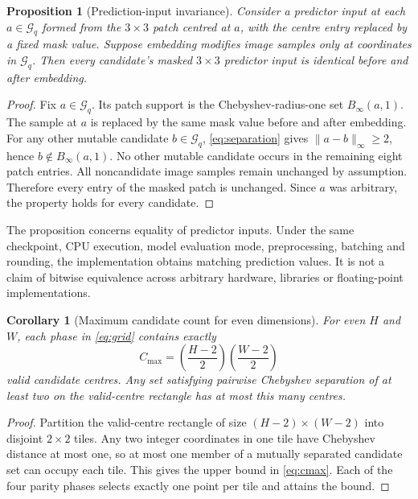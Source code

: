 \documentclass[preprint,12pt,a4paper]{elsarticle}
\newtheorem{proposition}{Proposition}
\newtheorem{corollary}{Corollary}
\begin{document}
\begin{proposition}[Prediction-input invariance]
\label{prop:invariance}
Consider a predictor input at each $a\in\mathcal{G}_q$ formed from the $3\times3$ patch centred at $a$, with the centre entry replaced by a fixed mask value. Suppose embedding modifies image samples only at coordinates in $\mathcal{G}_q$. Then every candidate's masked $3\times3$ predictor input is identical before and after embedding.
\end{proposition}
\begin{proof}
Fix $a\in\mathcal{G}_q$. Its patch support is the Chebyshev-radius-one set $B_\infty(a,1)$. The sample at $a$ is replaced by the same mask value before and after embedding. For any other mutable candidate $b\in\mathcal{G}_q$, \cref{eq:separation} gives $\|a-b\|_\infty\ge2$, hence $b\notin B_\infty(a,1)$. No other mutable candidate occurs in the remaining eight patch entries. All noncandidate image samples remain unchanged by assumption. Therefore every entry of the masked patch is unchanged. Since $a$ was arbitrary, the property holds for every candidate.
\end{proof}

The proposition concerns equality of predictor inputs. Under the same checkpoint, CPU execution, model evaluation mode, preprocessing, batching and rounding, the implementation obtains matching prediction values. It is not a claim of bitwise equivalence across arbitrary hardware, libraries or floating-point implementations.

\begin{corollary}[Maximum candidate count for even dimensions]
For even $H$ and $W$, each phase in \cref{eq:grid} contains exactly
\begin{equation}
C_{\max}=\left(\frac{H-2}{2}\right)\left(\frac{W-2}{2}\right)
\label{eq:cmax}
\end{equation}
valid candidate centres. Any set satisfying pairwise Chebyshev separation of at least two on the valid-centre rectangle has at most this many centres.
\end{corollary}
\begin{proof}
Partition the valid-centre rectangle of size $(H-2)\times(W-2)$ into disjoint $2\times2$ tiles. Any two integer coordinates in one tile have Chebyshev distance at most one, so at most one member of a mutually separated candidate set can occupy each tile. This gives the upper bound in \cref{eq:cmax}. Each of the four parity phases selects exactly one point per tile and attains the bound.
\end{proof}
\end{document}
